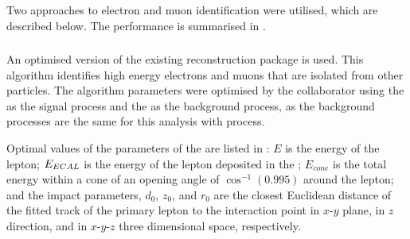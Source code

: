 Two approaches to electron and muon identification were utilised, which are described below. The performance is summarised in .



\subsubsection{\IsolatedLeptonFinderProcessor}
\label{sec:doubleHiggsIsolatedLeptonFinder}
An optimised version of the existing  \IsolatedLeptonFinderProcessor reconstruction package is used. This algorithm identifies high energy electrons and muons that are isolated from other particles. The algorithm parameters were optimised by the collaborator using the \eeToHHbbbb as the signal process and the \eeTo{ \Pquark \Pquark \Pquark \Pquark \Plepton \Pnu} as the background process, as the background processes are the same for this analysis with \eeToHHbbWW process.



Optimal values of the parameters of the \IsolatedLeptonFinderProcessor are listed in : $E$ is the energy of the lepton; $E_{ECAL}$ is the energy of the lepton deposited in the \ECAL; $E_{cone}$ is the total energy within a cone of an opening angle of $\cos^{-1}(0.995)$ around the lepton; and the impact parameters, $d_0$, $z_0$, and $r_0$ are the closest Euclidean distance of the fitted track of the primary lepton to the interaction point  in $x$-$y$ plane, in $z$ direction, and in $x$-$y$-$z$ three dimensional space, respectively.



